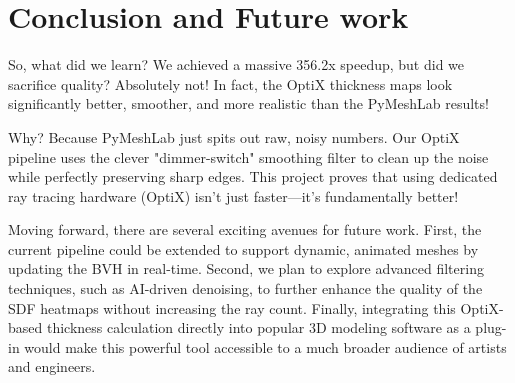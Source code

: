 \chapter{Conclusion and Future work}

So, what did we learn? We achieved a massive 356.2x speedup, but did we sacrifice quality? Absolutely not! In fact, the OptiX thickness maps look significantly better, smoother, and more realistic than the PyMeshLab results! 

Why? Because PyMeshLab just spits out raw, noisy numbers. Our OptiX pipeline uses the clever "dimmer-switch" smoothing filter to clean up the noise while perfectly preserving sharp edges. This project proves that using dedicated ray tracing hardware (OptiX) isn't just faster—it's fundamentally better!

Moving forward, there are several exciting avenues for future work. First, the current pipeline could be extended to support dynamic, animated meshes by updating the BVH in real-time. Second, we plan to explore advanced filtering techniques, such as AI-driven denoising, to further enhance the quality of the SDF heatmaps without increasing the ray count. Finally, integrating this OptiX-based thickness calculation directly into popular 3D modeling software as a plug-in would make this powerful tool accessible to a much broader audience of artists and engineers.
